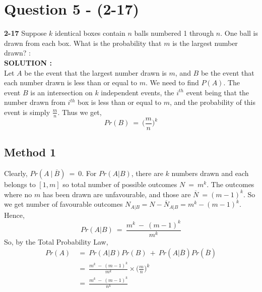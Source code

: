 \documentclass{article}
\begin{document}
\section{Question 5 - (2-17)}
\label{Q5}
\textbf{2-17}  Suppose $k$ identical boxes contain $n$ balls numbered 1 through $n$. One ball is drawn from each box. What is the probability that $m$ is the largest number drawn?  : \\

\hspace{1em} \large{\textbf{SOLUTION :}} \\
Let $A$ be the event that the largest number drawn is $m$, and $B$ be the event that each number drawn is less than or equal to $m$. We need to find $P(A)$. The event $B$ is an intersection on $k$ independent events, the $i^{th}$ event being that the number drawn from $i^{th}$ box is less than or equal to $m$, and the probability of this event is simply $\frac{m}{n}$. Thus we get,
\begin{equation*}
    Pr(B)\ =\ \Big(\frac{m}{n}\Big)^k
\end{equation*}
\subsection*{Method 1}
Clearly, $Pr(A\ |\ \overline{B})\ =\ 0$. For $Pr(A|B)$, there are $k$ numbers drawn and each belongs to $[1,m]$ so total number of possible outcomes $N\ =\ m^k$. The outcomes where no $m$ has been drawn are unfavourable, and those are $\overline{N}\ = (m-1)^k$. So we get number of favourable outcomes $N_{A|B} = N -\overline{N}_{A|B} = m^k - (m-1)^k$. Hence, 
\begin{equation*}
    Pr(A|B)\ = \ \frac{m^k\ -\ (m-1)^k}{m^k}
\end{equation*}
So, by the Total Probability Law,
\begin{equation*}
\begin{split}
Pr(A)\ &= \ Pr(A|B)Pr(B)\ +\ Pr(A|\overline{B})Pr(\overline{B}) \\
       &= \ \frac{m^k\ -\ (m-1)^k}{m^k} \times \Big(\frac{m}{n}\Big)^k \\
       &= \ \frac{m^k\ -\ (m-1)^k}{n^k}
\end{split}
\end{equation*}
\end{document}
